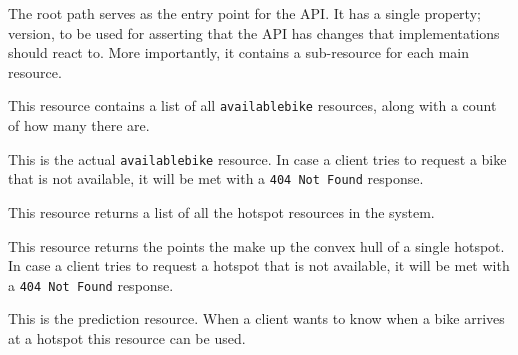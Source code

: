 {The root path serves as the entry point for the API.
It has a single property; version, to be used for asserting that the API has changes that implementations should react to.
More importantly, it contains a sub-resource for each main resource.}

{This resource contains a list of all \texttt{availablebike} resources, along with a count of how many there are.}


{This is the actual \texttt{availablebike} resource.
In case a client tries to request a bike that is not available, it will be met with a \texttt{404 Not Found} response.}


{This resource returns a list of all the hotspot resources in the system.}

{This resource returns the points the make up the convex hull of a single hotspot.
In case a client tries to request a hotspot that is not available, it will be met with a \texttt{404 Not Found} response.}


{This is the prediction resource.
When a client wants to know when a bike arrives at a hotspot this resource can be used.}




